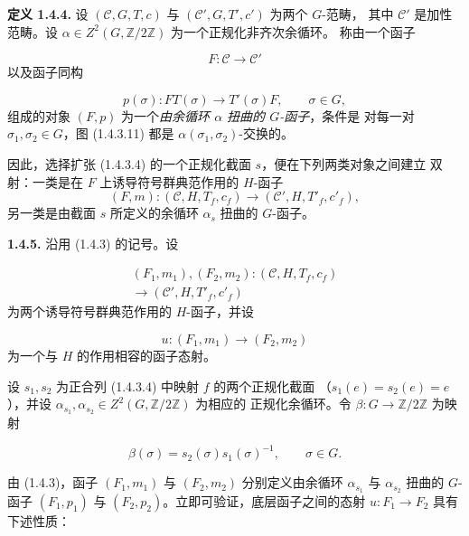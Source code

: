 \clearpage
{}%
\noindent\textbf{定义 1.4.4.}\quad
设 $(\mathcal C,G,T,c)$ 与 $(\mathcal C',G,T',c')$ 为两个 $G$-范畴，
其中 $\mathcal C'$ 是加性范畴。设
$\alpha\in Z^2(G,\mathbb Z/2\mathbb Z)$ 为一个正规化非齐次余循环。
称由一个函子

\[
  F\colon\mathcal C\longrightarrow\mathcal C'
\]
以及函子同构

\[
  p(\sigma)\colon FT(\sigma)\longrightarrow T'(\sigma)F,
  \qquad \sigma\in G,
\]
组成的对象 $(F,p)$ 为一个\emph{由余循环 $\alpha$ 扭曲的 $G$-函子}，条件是
对每一对 $\sigma_1,\sigma_2\in G$，图 (1.4.3.11) 都是
$\alpha(\sigma_1,\sigma_2)$-交换的。

因此，选择扩张 (1.4.3.4) 的一个正规化截面 $s$，便在下列两类对象之间建立
双射：一类是在 $F$ 上诱导符号群典范作用的 $H$-函子
\[
  (F,m)\colon(\mathcal C,H,T_f,c_f)
  \longrightarrow(\mathcal C',H,T'_f,c'_f),
\]
另一类是由截面 $s$ 所定义的余循环 $\alpha_s$ 扭曲的 $G$-函子。

\noindent\textbf{1.4.5.}\quad
沿用 (1.4.3) 的记号。设

\begin{equation}
  \begin{gathered}
    (F_1,m_1),(F_2,m_2)\colon
    (\mathcal C,H,T_f,c_f)\\[-0.2em]
    \longrightarrow(\mathcal C',H,T'_f,c'_f)
  \end{gathered}
  \tag{1.4.5.1}
\end{equation}
为两个诱导符号群典范作用的 $H$-函子，并设

\begin{equation}
  u\colon(F_1,m_1)\longrightarrow(F_2,m_2)
  \tag{1.4.5.2}
\end{equation}
为一个与 $H$ 的作用相容的函子态射。

设 $s_1,s_2$ 为正合列 (1.4.3.4) 中映射 $f$ 的两个正规化截面
（$s_1(e)=s_2(e)=e$），并设
$\alpha_{s_1},\alpha_{s_2}\in Z^2(G,\mathbb Z/2\mathbb Z)$ 为相应的
正规化余循环。令 $\beta\colon G\to\mathbb Z/2\mathbb Z$ 为映射

\begin{equation}
  \beta(\sigma)=s_2(\sigma)s_1(\sigma)^{-1},
  \qquad \sigma\in G.
  \tag{1.4.5.3}
\end{equation}

由 (1.4.3)，函子 $(F_1,m_1)$ 与 $(F_2,m_2)$ 分别定义由余循环
$\alpha_{s_1}$ 与 $\alpha_{s_2}$ 扭曲的 $G$-函子 $(F_1,p_1)$ 与
$(F_2,p_2)$。立即可验证，底层函子之间的态射 $u\colon F_1\to F_2$ 具有
下述性质：

